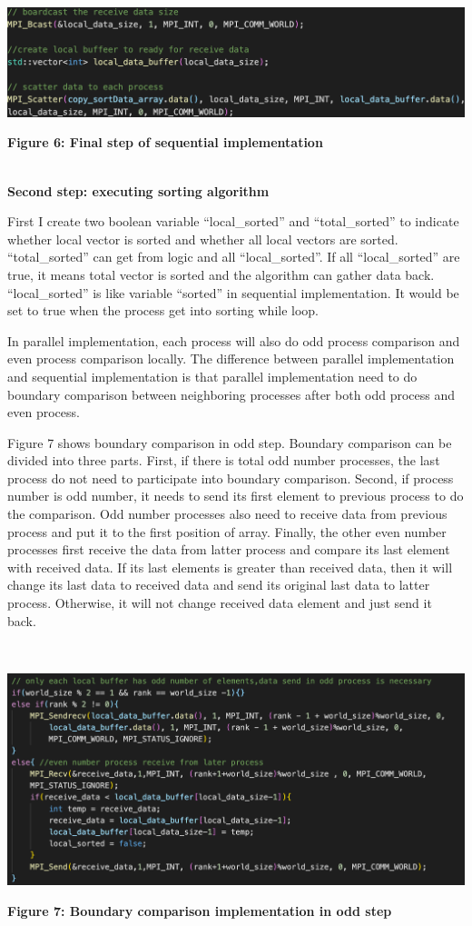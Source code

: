 ~\\
\centerline {\includegraphics[scale = 1, width=14cm]{para_input3}}
\centerline{\textbf {Figure 6: Final step of sequential implementation}}

~\\
\textbf{Second step: executing sorting algorithm}

First I create two boolean variable “local\_sorted” and “total\_sorted” to indicate whether local vector is sorted and whether all local vectors are sorted. “total\_sorted” can get from logic and all “local\_sorted”. If all “local\_sorted” are true, it means total vector is sorted and the algorithm can gather data back. “local\_sorted” is like variable “sorted” in sequential implementation. It would be set to true when the process get into sorting while loop.

In parallel implementation, each process will also do odd process comparison and even process comparison locally. The difference between parallel implementation and sequential implementation is that parallel implementation need to do boundary comparison between neighboring processes after both odd process and even process.

Figure 7 shows boundary comparison in odd step. Boundary comparison can be divided into three parts. First, if there is total odd number processes, the last process do not need to participate into boundary comparison. Second, if process number is odd number, it needs to send its first element to previous process to do the comparison. Odd number processes also need to receive data from previous process and put it to the first position of array. Finally, the other even number processes first receive the data from latter process and compare its last element with received data. If its last elements is greater than received data, then it will change its last data to received data and send its original last data to latter process. Otherwise, it will not change received data element and just send it back.

~\\
\centerline {\includegraphics[scale = 1, width=14cm]{para_bo}}
\centerline{\textbf {Figure 7: Boundary comparison implementation in odd step}}

